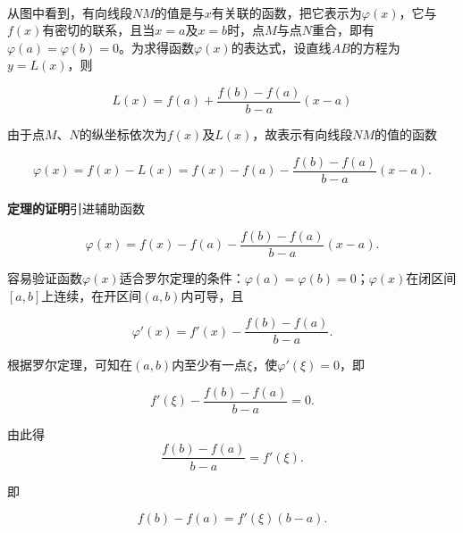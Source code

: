 \paragraph{}
从图中看到，有向线段$NM$的值是与$x$有关联的函数，把它表示为$\varphi(x)$，它与$f(x)$有密切的联系，且当$x=a$及$x=b$时，点$M$与点$N$重合，即有$\varphi(a)=\varphi(b)=0$。为求得函数$\varphi(x)$的表达式，设直线$AB$的方程为$y=L(x)$，则

\begin{equation*}
  L(x) = f(a) + \frac{f(b) - f(a)}{b - a}(x-a)
\end{equation*}

由于点$M$、$N$的纵坐标依次为$f(x)$及$L(x)$，故表示有向线段$NM$的值的函数

\begin{equation*}
  \varphi(x) = f(x) - L(x) = f(x) - f(a) - \frac{f(b) - f(a)}{b - a}(x - a).
\end{equation*}

\paragraph{}
\textbf{定理的证明\;}引进辅助函数

\begin{equation}
  \varphi(x) = f(x) - f(a) - \frac{f(b) - f(a)}{b - a}(x - a).
\end{equation}

容易验证函数$\varphi(x)$适合罗尔定理的条件：$\varphi(a) = \varphi(b) = 0$；$\varphi(x)$在闭区间$[a,b]$上连续，在开区间$(a,b)$内可导，且

\begin{equation}
  \varphi'(x) = f'(x) - \frac{f(b) - f(a)}{b - a}.
\end{equation}

根据罗尔定理，可知在$(a,b)$内至少有一点$\xi$，使$\varphi'(\xi) = 0$，即

\begin{equation}
  f'(\xi) - \frac{f(b) - f(a)}{b - a} = 0.
\end{equation}

由此得
\begin{equation}
  \frac{f(b) - f(a)}{b - a} = f'(\xi).
\end{equation}

即

\begin{equation}
  \label{拉格朗日中值公式}
  f(b) - f(a) = f'(\xi)(b - a).
\end{equation}

